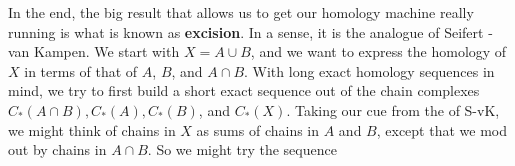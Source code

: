 \def\ccy{\Cyan}		  %
\def\cpb{\ProcessBlue}	  %
\def\csb{\SkyBlue}	  %
\def\ctu{\Turquoise}	  %
\def\ctb{\TealBlue}	  %
\def\caq{\Aquamarine}	  %
\def\cbg{\BlueGreen}	  %
\def\cem{\Emerald}	  %
\def\csg{\SeaGreen}	  %
\def\cgg{\Green}	  %
\def\cfg{\ForestGreen}	  %
\def\cpg{\PineGreen}	  %
\def\clg{\LimeGreen}	  %
\def\cyg{\YellowGreen}	  %
\def\cspg{\SpringGreen}	  %
\def\cog{\OliveGreen}	  %
\def\pars{\RawSienna}	  %
\def\cse{\Sepia}		  %
\def\cbr{\Brown}		  %
\def\cta{\Tan}		  %
\def\cgr{\Gray}		  %
\def\cbl{\Black}		  %
\def\cwh{\White}		  %


\loadmsbm



\def\ctln{\centerline}
\def\u{\underbar}
\def\ssk{\smallskip}
\def\msk{\medskip}
\def\bsk{\bigskip}
\def\hsk{\hskip.1in}
\def\hhsk{\hskip.2in}
\def\dsl{\displaystyle}
\def\hskp{\hskip1.5in}

\def\lra{$\Leftrightarrow$ }
\def\ra{\rightarrow}
\def\mpto{\logmapsto}
\def\pu{\pi_1}
\def\mpu{$\pi_1$}
\def\sig{\Sigma}
\def\msig{$\Sigma$}
\def\ep{\epsilon}
\def\sset{\subseteq}
\def\del{\partial}
\def\inv{^{-1}}
\def\wtl{\widetilde}
\def\del{\partial}
\def\delp{\partial^\prime}
\def\delpp{\partial^{\prime\prime}}
\def\sgn{{\roman{sgn}}}
\def\wtih{\widetilde{H}}
\def\bbz{{\Bbb Z}}
\def\bbr{{\Bbb R}}


In the end, the big result that allows us to get our homology machine really running is what is
known as {\bf excision}. In a sense, it is the analogue of
Seifert - van Kampen. We start with $X=A\cup B$, and we want to
express the homology of $X$ in terms of that of $A$, $B$, and $A\cap B$. 
With long exact homology sequences in mind, we try to first build
a short exact sequence out of the chain complexes $C_*(A\cap B), C_*(A), C_*(B)$, and $C_*(X)$.
Taking our cue from the \u{proof} of S-vK, we might think of chains in $X$ as sums of 
chains in $A$ and $B$, except that we mod out by chains in $A\cap B$. So
we might try the sequence

